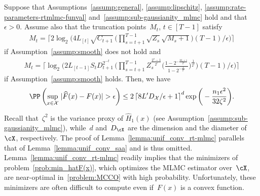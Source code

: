 \documentclass[11pt]{article}
\let\hat\widehat
\begin{document}
\begin{lemma}
\label{lemma:unif_conv_rt-mlmc}
Suppose that Assumptions~\ref{assump:general}, \ref{assump:lipschitz}, \ref{assump:rate-parameters-rtmlmc-funval} and~\ref{assump:sub-gaussianity_mlmc} hold and that $\epsilon>0$. Assume also that the truncation points~$M_t$, $t\in[T-1]$ satisfy
\begin{align*}
     M_{t} = \bigg\lceil 2\log_2\Big( \textstyle 4 L_{[t]}\sqrt{C_{t+1}} \, \Big( \prod_{s=t+1}^{T-1} \sqrt{Z_s} \sqrt{M_s+1} \Big) (T-1)/\epsilon \Big) \bigg\rceil
\end{align*}
if Assumption~\ref{assump:smooth} does not hold and
\begin{align*}
     \textstyle M_{t}  = \bigg\lceil\log_2\bigg( 2 L_{[t-1]}S_{t}D_{t+1}^{2^{-t}} \, \bigg( \prod_{s=t+1}^{T-1}Z_s^{\frac{2^s-1}{2^t}} \Big(\frac{1-2^{-\frac{M_s+1}{2^s}}}{1-2^{-\frac{1}{2^s}}} \Big)^\frac{1}{2^t} \bigg)  (T-1)/\epsilon\bigg)\bigg\rceil
\end{align*}
if Assumption~\ref{assump:smooth} holds. Then, we have   
    \begin{align*}
    \PP\left(\sup_{x\in \mathcal{X}} \; \lvert \hat{F}(x) - F(x) \rvert > \epsilon \right) \leq
    2\left\lceil 8 L' D_\mathcal{X}/\epsilon +1\right\rceil^{d} \exp\bigg(- \frac{n_1\epsilon^2}{32\zeta^2} \bigg).
    \end{align*}
\end{lemma}
Recall that~$\zeta^2$ is the variance proxy of $\hat{H}_1(x)$ (see Assumption~\ref{assump:sub-gaussianity_mlmc}), while~$d$ and~$D_{\cX}$ are the dimension and the diameter of~$\cX$, respectively. The proof of Lemma~\ref{lemma:unif_conv_rt-mlmc} parallels that of Lemma~\ref{lemma:unif_conv_saa} and is thus omitted. Lemma~\ref{lemma:unif_conv_rt-mlmc} readily implies that the minimizers of problem~\eqref{prob:min_hatF(x)}, which optimizes the MLMC estimator over~$\cX$, are near-optimal in~\eqref{problem:MCCO} with high probability. Unfortunately, these minimizers are often difficult to compute even if~$F(x)$ is a convex function.
\end{document}
